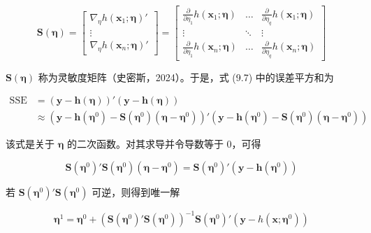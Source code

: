 \documentclass{ctexart}
\begin{document}
\begin{equation*}
\boldsymbol{S}(\boldsymbol{\eta})=\begin{bmatrix}
\nabla_{\eta}h(\boldsymbol{x}_1;\boldsymbol{\eta})'\\\vdots\\\nabla_{\eta}h(\boldsymbol{x}_n;\boldsymbol{\eta})'
\end{bmatrix}=\begin{bmatrix}
\frac{\partial}{\partial\eta_1}h(\boldsymbol{x}_1;\boldsymbol{\eta})&\dots&\frac{\partial}{\partial\eta_q}h(\boldsymbol{x}_1;\boldsymbol{\eta})\\
\vdots&\ddots&\vdots\\
\frac{\partial}{\partial\eta_1}h(\boldsymbol{x}_n;\boldsymbol{\eta})&\dots&\frac{\partial}{\partial\eta_q}h(\boldsymbol{x}_n;\boldsymbol{\eta})
\end{bmatrix}
\end{equation*}

$\boldsymbol{S}(\boldsymbol{\eta})$ 称为灵敏度矩阵（史密斯，2024）。于是，式 (9.7) 中的误差平方和为

\begin{align*}
\mathrm{SSE}&=(\boldsymbol{y}-\boldsymbol{h}(\boldsymbol{\eta}))'(\boldsymbol{y}-\boldsymbol{h}(\boldsymbol{\eta}))\\
&\approx(\boldsymbol{y}-\boldsymbol{h}(\boldsymbol{\eta}^0)-\boldsymbol{S}(\boldsymbol{\eta}^0)(\boldsymbol{\eta}-\boldsymbol{\eta}^0))'(\boldsymbol{y}-\boldsymbol{h}(\boldsymbol{\eta}^0)-\boldsymbol{S}(\boldsymbol{\eta}^0)(\boldsymbol{\eta}-\boldsymbol{\eta}^0))
\end{align*}

该式是关于 $\boldsymbol{\eta}$ 的二次函数。对其求导并令导数等于 0，可得

\begin{equation*}
\boldsymbol{S}(\boldsymbol{\eta}^0)'\boldsymbol{S}(\boldsymbol{\eta}^0)(\boldsymbol{\eta}-\boldsymbol{\eta}^0)=\boldsymbol{S}(\boldsymbol{\eta}^0)'(\boldsymbol{y}-\boldsymbol{h}(\boldsymbol{\eta}^0))
\end{equation*}

若 $\boldsymbol{S}(\boldsymbol{\eta}^0)'\boldsymbol{S}(\boldsymbol{\eta}^0)$ 可逆，则得到唯一解

\begin{equation*}
\boldsymbol{\eta}^1=\boldsymbol{\eta}^0+(\boldsymbol{S}(\boldsymbol{\eta}^0)'\boldsymbol{S}(\boldsymbol{\eta}^0))^{-1}\boldsymbol{S}(\boldsymbol{\eta}^0)'(\boldsymbol{y}-h(\boldsymbol{x};\boldsymbol{\eta}^0))
\end{equation*}
\end{document}
